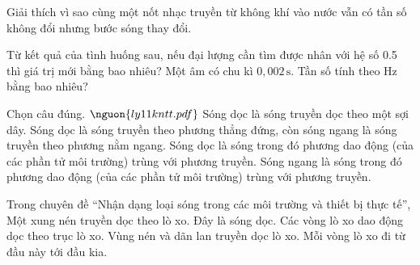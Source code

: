 \begin{ex}
Giải thích vì sao cùng một nốt nhạc truyền từ không khí vào nước vẫn có tần số không đổi nhưng bước sóng thay đổi.
\choiceTF

\end{ex}

\begin{ex}
Từ kết quả của tình huống sau, nếu đại lượng cần tìm được nhân với hệ số 0.5 thì giá trị mới bằng bao nhiêu? Một âm có chu kì $0,002\,\text{s}$. Tần số tính theo Hz bằng bao nhiêu?
\end{ex}

\begin{ex}
Chọn câu đúng. $\nguon{ly11 kntt.pdf}$
\choice
{Sóng dọc là sóng truyền dọc theo một sợi dây.}
{Sóng dọc là sóng truyền theo phương thẳng đứng, còn sóng ngang là sóng truyền theo phương nằm ngang.}
{\True Sóng dọc là sóng trong đó phương dao động (của các phần tử môi trường) trùng với phương truyền.}
{Sóng ngang là sóng trong đó phương dao động (của các phần tử môi trường) trùng với phương truyền.}
\end{ex}

\begin{ex}
Trong chuyên đề “Nhận dạng loại sóng trong các môi trường và thiết bị thực tế”, Một xung nén truyền dọc theo lò xo.
\choiceTF
{\True Đây là sóng dọc.}
{\True Các vòng lò xo dao động dọc theo trục lò xo.}
{\True Vùng nén và dãn lan truyền dọc lò xo.}
{Mỗi vòng lò xo đi từ đầu này tới đầu kia.}
\end{ex}

